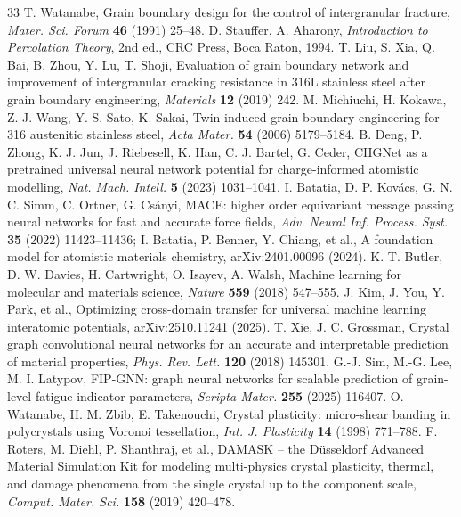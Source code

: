 \documentclass[11pt]{article}
\begin{document}
\begin{thebibliography}{33}
 T. Watanabe, Grain boundary design for the control of intergranular fracture, \textit{Mater. Sci. Forum} \textbf{46} (1991) 25--48.
 D. Stauffer, A. Aharony, \textit{Introduction to Percolation Theory}, 2nd ed., CRC Press, Boca Raton, 1994.
 T. Liu, S. Xia, Q. Bai, B. Zhou, Y. Lu, T. Shoji, Evaluation of grain boundary network and improvement of intergranular cracking resistance in 316L stainless steel after grain boundary engineering, \textit{Materials} \textbf{12} (2019) 242.
 M. Michiuchi, H. Kokawa, Z. J. Wang, Y. S. Sato, K. Sakai, Twin-induced grain boundary engineering for 316 austenitic stainless steel, \textit{Acta Mater.} \textbf{54} (2006) 5179--5184.
 B. Deng, P. Zhong, K. J. Jun, J. Riebesell, K. Han, C. J. Bartel, G. Ceder, CHGNet as a pretrained universal neural network potential for charge-informed atomistic modelling, \textit{Nat. Mach. Intell.} \textbf{5} (2023) 1031--1041.
 I. Batatia, D. P. Kovács, G. N. C. Simm, C. Ortner, G. Csányi, MACE: higher order equivariant message passing neural networks for fast and accurate force fields, \textit{Adv. Neural Inf. Process. Syst.} \textbf{35} (2022) 11423--11436; I. Batatia, P. Benner, Y. Chiang, et al., A foundation model for atomistic materials chemistry, arXiv:2401.00096 (2024).
 K. T. Butler, D. W. Davies, H. Cartwright, O. Isayev, A. Walsh, Machine learning for molecular and materials science, \textit{Nature} \textbf{559} (2018) 547--555.
 J. Kim, J. You, Y. Park, et al., Optimizing cross-domain transfer for universal machine learning interatomic potentials, arXiv:2510.11241 (2025).
 T. Xie, J. C. Grossman, Crystal graph convolutional neural networks for an accurate and interpretable prediction of material properties, \textit{Phys. Rev. Lett.} \textbf{120} (2018) 145301.
 G.-J. Sim, M.-G. Lee, M. I. Latypov, FIP-GNN: graph neural networks for scalable prediction of grain-level fatigue indicator parameters, \textit{Scripta Mater.} \textbf{255} (2025) 116407.
 O. Watanabe, H. M. Zbib, E. Takenouchi, Crystal plasticity: micro-shear banding in polycrystals using Voronoi tessellation, \textit{Int. J. Plasticity} \textbf{14} (1998) 771--788.
 F. Roters, M. Diehl, P. Shanthraj, et al., DAMASK -- the Düsseldorf Advanced Material Simulation Kit for modeling multi-physics crystal plasticity, thermal, and damage phenomena from the single crystal up to the component scale, \textit{Comput. Mater. Sci.} \textbf{158} (2019) 420--478.

\end{thebibliography}
\end{document}
